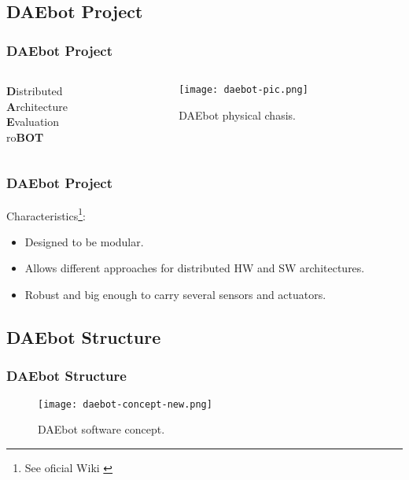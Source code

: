 
\subsection{DAEbot Project}

\begin{frame}
	\frametitle{DAEbot Project}
	\begin{columns}
		\begin{column}{0.4\textwidth}
			\begin{flushleft}
				\LARGE
				\textbf{D}istributed \\
				\textbf{A}rchitecture \\
				\textbf{E}valuation \\
				ro\textbf{BOT}
			\end{flushleft}
		\end{column}
		\pause
		\begin{column}{0.6\textwidth}
			\begin{figure}
				\texttt{[image: daebot-pic.png]}
				\caption{DAEbot physical chasis.}\label{fig:daebot-pic}
			\end{figure}
		\end{column}
	\end{columns}
\end{frame}

\begin{frame}
	\frametitle{DAEbot Project}
	Characteristics\footnote[frame]{See oficial Wiki \cite{Wiki}}:
	\begin{itemize}
		\pause
		\item Designed to be modular.
		\pause
		\item Allows different approaches for distributed HW and SW architectures.
		\pause
		\item Robust and big enough to carry several sensors and actuators.
	\end{itemize}
\end{frame}

\subsection{DAEbot Structure}

\begin{frame}
	\frametitle{DAEbot Structure}
	\begin{figure}
		\texttt{[image: daebot-concept-new.png]}
		\caption{DAEbot software concept.}\label{fig:daebot-concept-new}
	\end{figure}
\end{frame}

